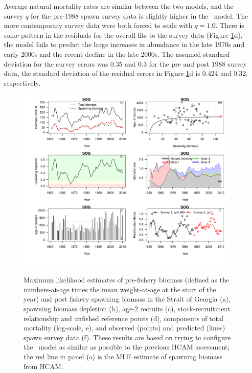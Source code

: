 
Average natural mortality rates are similar between the two models, and the survey $q$ for the pre-1988 spawn survey data is slightly higher in the \iscam\ model.  The more contemporary survey data were both forced to scale with $q=1.0$.  There is some pattern in the residuals for the overall fits to the survey data (Figure \ref{fig1_HCAM_ctrl}d), the model fails to predict the large increases in abundance in the late 1970s and early 2000s and the recent decline in the late 2000s.  The assumed standard deviation for the survey errors was 0.35 and 0.3 for the pre and post 1988 survey data, the standard deviation of the residual errors in Figure \ref{fig1_HCAM_ctrl}d is 0.424 and 0.32, respectively.
	
\begin{figure}[!tbp]
	\includegraphics[width=\textwidth]{../Figs/iscam_fig_HCAM_SOG_MLE.pdf}\\
	\caption{Maximum likelihood estimates of pre-fishery biomass (defined as the numbers-at-age times the mean weight-at-age at the start of the year) and post fishery spawning biomass in the Strait of Georgia (a), spawning biomass depletion (b), age-2 recruits (c), stock-recruitment relationship and unfished reference points (d), components of total mortality (log-scale, e), and observed (points) and predicted (lines) spawn survey data (f).  These results are based on trying to configure the \iscam\ model as similar as possible to the previous HCAM assessment; the red line in panel (a) is the MLE estimate of spawning biomass from HCAM.}\label{fig1_HCAM_ctrl}
\end{figure}


